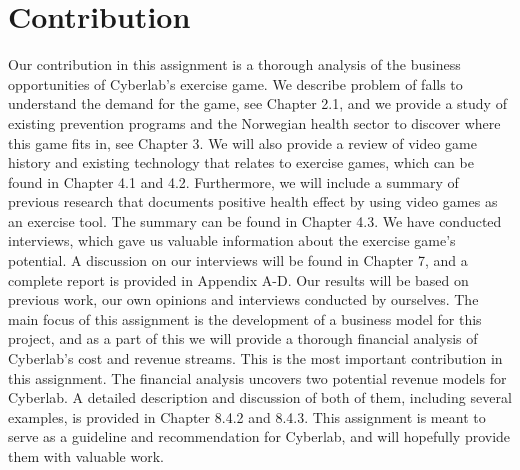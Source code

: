 \section{Contribution}
Our contribution in this assignment is a thorough analysis of the business opportunities of Cyberlab’s exercise game. We describe problem of falls to understand the demand for the game, see Chapter 2.1, and we provide a study of existing prevention programs and the Norwegian health sector to discover where this game fits in, see Chapter 3. We will also provide a review of video game history and existing technology that relates to exercise games, which can be found in Chapter 4.1 and 4.2. Furthermore, we will include a summary of previous research that documents positive health effect by using video games as an exercise tool. The summary can be found in Chapter 4.3. We have conducted interviews, which gave us valuable information about the exercise game’s potential. A discussion on our interviews will be found in Chapter 7, and a complete report is provided in Appendix A-D. Our results will be based on previous work, our own opinions and interviews conducted by ourselves. The main focus of this assignment is the development of a business model for this project, and as a part of this we will provide a thorough financial analysis of Cyberlab’s cost and revenue streams. This is the most important contribution in this assignment. The financial analysis uncovers two potential revenue models for Cyberlab. A detailed description and discussion of both of them, including several examples, is provided in Chapter 8.4.2 and 8.4.3. This assignment is meant to serve as a guideline and recommendation for Cyberlab, and will hopefully provide them with valuable work.

